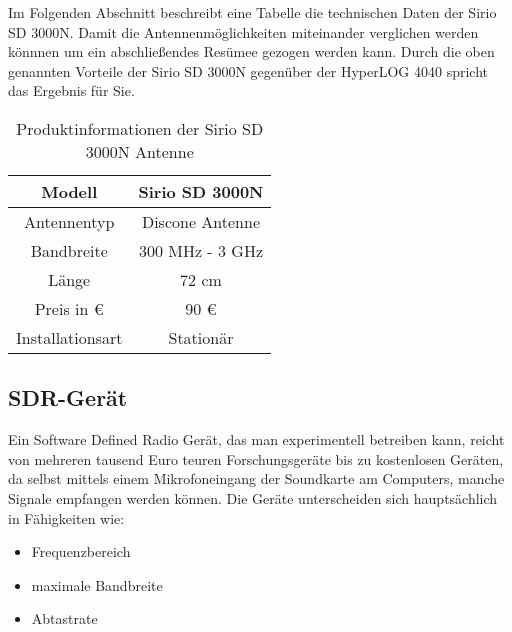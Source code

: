 Im Folgenden Abschnitt beschreibt eine Tabelle die technischen Daten der Sirio SD 3000N. Damit die Antennenmöglichkeiten miteinander verglichen werden könnnen um ein abschließendes Resümee gezogen werden kann. Durch die oben genannten Vorteile der Sirio SD 3000N gegenüber der HyperLOG 4040 spricht das Ergebnis für Sie. 

\begin{table}[ht]
	\centering
	\begin{tabular}{c|c}
		Modell & Sirio SD 3000N\\
		\hline
		Antennentyp & Discone Antenne\\ 
		\hline 
		Bandbreite & 300 MHz - 3 GHz\\ 
		\hline 
		Länge &  72 cm\\ 
		\hline 
		Preis in \euro &  90 \euro \\ 
		\hline 
		Installationsart & Stationär\\ 
		
	\end{tabular} 
	\caption{Produktinformationen der Sirio SD 3000N Antenne}
\end{table}


\subsection{SDR-Gerät} %
Ein Software Defined Radio Gerät, das man experimentell betreiben kann, reicht von mehreren tausend Euro teuren Forschungsgeräte bis zu kostenlosen Geräten, da selbst mittels einem Mikrofoneingang der Soundkarte am Computers, manche Signale empfangen werden können. Die Geräte unterscheiden sich hauptsächlich in Fähigkeiten wie:
\begin{itemize}
	\item Frequenzbereich
	\item maximale Bandbreite
	\item Abtastrate
\end{itemize}

